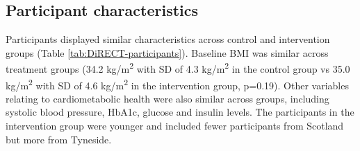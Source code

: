 \documentclass[11pt,twoside]{bristolthesis}
\begin{document}
\hypertarget{participant-characteristics-2}{%
\subsection{Participant characteristics}\label{participant-characteristics-2}}

Participants displayed similar characteristics across control and intervention groups (Table \ref{tab:DiRECT-participants}). Baseline BMI was similar across treatment groups (34.2 kg/m\textsuperscript{2} with SD of 4.3 kg/m\textsuperscript{2} in the control group vs 35.0 kg/m\textsuperscript{2} with SD of 4.6 kg/m\textsuperscript{2} in the intervention group, p=0.19). Other variables relating to cardiometabolic health were also similar across groups, including systolic blood pressure, HbA1c, glucose and insulin levels. The participants in the intervention group were younger and included fewer participants from Scotland but more from Tyneside.
\end{document}
